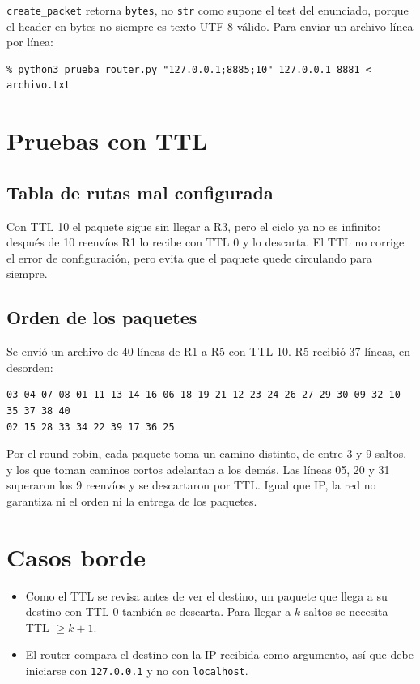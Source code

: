 \documentclass[11pt,letterpaper]{article}
\begin{document}
\texttt{create\_packet} retorna \texttt{bytes}, no \texttt{str} como supone el test del
enunciado, porque el header en bytes no siempre es texto UTF-8 válido. Para enviar un
archivo línea por línea:

\begin{lstlisting}
% python3 prueba_router.py "127.0.0.1;8885;10" 127.0.0.1 8881 < archivo.txt
\end{lstlisting}

\section{Pruebas con TTL}

\subsection{Tabla de rutas mal configurada}

Con TTL 10 el paquete sigue sin llegar a R3, pero el ciclo ya no es infinito: después de
10 reenvíos R1 lo recibe con TTL 0 y lo descarta. El TTL no corrige el error de
configuración, pero evita que el paquete quede circulando para siempre.

\subsection{Orden de los paquetes}

Se envió un archivo de 40 líneas de R1 a R5 con TTL 10. R5 recibió 37 líneas, en desorden:

\begin{lstlisting}
03 04 07 08 01 11 13 14 16 06 18 19 21 12 23 24 26 27 29 30 09 32 10 35 37 38 40
02 15 28 33 34 22 39 17 36 25
\end{lstlisting}

Por el round-robin, cada paquete toma un camino distinto, de entre 3 y 9 saltos, y los que
toman caminos cortos adelantan a los demás. Las líneas 05, 20 y 31 superaron los 9
reenvíos y se descartaron por TTL. Igual que IP, la red no garantiza ni el orden ni la
entrega de los paquetes.

\section{Casos borde}

\begin{itemize}[nosep]
  \item Como el TTL se revisa antes de ver el destino, un paquete que llega a su destino
        con TTL 0 también se descarta. Para llegar a $k$ saltos se necesita TTL $\geq k+1$.
  \item El router compara el destino con la IP recibida como argumento, así que debe
        iniciarse con \texttt{127.0.0.1} y no con \texttt{localhost}.
\end{itemize}
\end{document}
